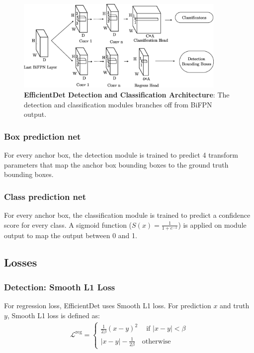\documentclass[12pt,a4paper,twoside,openany]{report}
\newcommand{\regloss}{\mathcal{L}^\text{reg}}
\begin{document}
\begin{figure}[h]
    \centering
    \includegraphics[width=0.9\textwidth]{figs/implementation/efficientdet_heads.jpg}
    \caption{\textbf{EfficientDet Detection and Classification Architecture}: The detection and classification modules branches off from BiFPN output.}
    \label{fig:edet_heads}
\end{figure}
\subsubsection{Box prediction net}
For every anchor box, the detection module is trained to predict 4 transform parameters that map the anchor box bounding boxes to the ground truth bounding boxes. 

\subsubsection{Class prediction net}
For every anchor box, the classification module is trained to predict a confidence score for every class. A sigmoid function ($S(x)=\frac{1}{1+e^{-x}}$) is applied on module output to map the output between 0 and 1. 

\subsection{Losses}
\subsubsection{Detection: Smooth L1 Loss}
For regression loss, EfficientDet uses Smooth L1 loss. For prediction $x$ and truth $y$, Smooth L1 loss is defined as: 
\begin{align} \label{eq:smooth_l1}
    \regloss = \begin{cases}
        \frac{1}{2\beta}(x-y)^2\quad\ \text{if } |x-y| < \beta\\
        |x-y|-\frac{1}{2\beta}\quad \text{otherwise}
    \end{cases}
\end{align}
\end{document}
